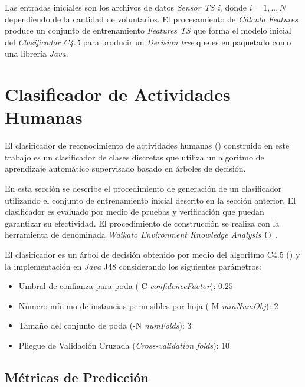 Las entradas iniciales son los archivos de datos \emph{Sensor TS i},
donde $i=1,..,N$ dependiendo de la cantidad de voluntarios. El procesamiento
de \emph{Cálculo Features} produce un conjunto de entrenamiento \emph{Features
TS }que forma el modelo inicial del \emph{Clasificador C4.5} para
producir un \emph{Decision tree} que es empaquetado como una librería
\emph{Java}.

\section{Clasificador de Actividades Humanas}

\label{sec6:clasificador}El clasificador de reconocimiento de actividades
humanas () construido en este trabajo es un clasificador
de clases discretas que utiliza un algoritmo de aprendizaje automático
supervisado basado en árboles de decisión. 

En esta sección se describe el procedimiento de generación de un clasificador
 utilizando el conjunto de entrenamiento inicial descrito
en la sección anterior. El clasificador es evaluado por medio de pruebas
y verificación que puedan garantizar su efectividad. El procedimiento
de construcción se realiza con la herramienta de  denominada
\emph{Waikato Environment Knowledge Analysis} \texttt{()}
\cite{Frank2016}.

El clasificador es un árbol de decisión obtenido por medio del algoritmo
C4.5 () y la implementación en \emph{Java} J48 \cite{Frank2016b}
considerando los siguientes parámetros:
\begin{itemize}
\item Umbral de confianza para poda\emph{ }(-C\emph{ confidenceFactor}):
$0.25$
\item Número mínimo de instancias permisibles por hoja\emph{ }(-M\emph{
minNumObj}): $2$
\item Tamaño del conjunto de poda\emph{ }(-N\emph{ numFolds}): $3$
\item Pliegue de Validación Cruzada\emph{ }(\emph{Cross-validation folds}):
$10$
\end{itemize}

\subsection{Métricas de Predicción }

